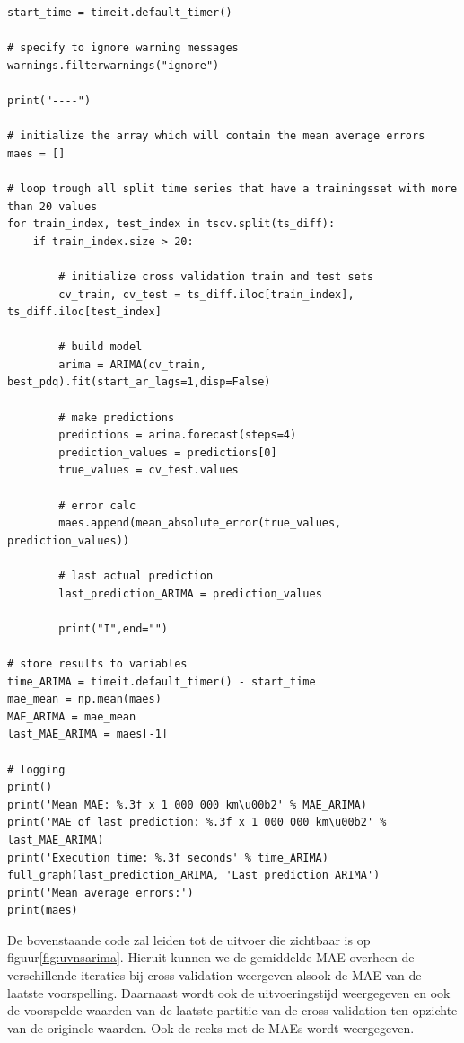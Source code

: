 \begin{verbatim}
start_time = timeit.default_timer()

# specify to ignore warning messages
warnings.filterwarnings("ignore") 

print("----")

# initialize the array which will contain the mean average errors
maes = []

# loop trough all split time series that have a trainingsset with more than 20 values
for train_index, test_index in tscv.split(ts_diff):
    if train_index.size > 20:
    
        # initialize cross validation train and test sets
        cv_train, cv_test = ts_diff.iloc[train_index], ts_diff.iloc[test_index]
        
        # build model
        arima = ARIMA(cv_train, best_pdq).fit(start_ar_lags=1,disp=False)
        
        # make predictions
        predictions = arima.forecast(steps=4)
        prediction_values = predictions[0]
        true_values = cv_test.values
        
        # error calc
        maes.append(mean_absolute_error(true_values, prediction_values))
        
        # last actual prediction 
        last_prediction_ARIMA = prediction_values
        
        print("I",end="")

# store results to variables
time_ARIMA = timeit.default_timer() - start_time
mae_mean = np.mean(maes)
MAE_ARIMA = mae_mean
last_MAE_ARIMA = maes[-1]

# logging
print()
print('Mean MAE: %.3f x 1 000 000 km\u00b2' % MAE_ARIMA)
print('MAE of last prediction: %.3f x 1 000 000 km\u00b2' % last_MAE_ARIMA)
print('Execution time: %.3f seconds' % time_ARIMA)
full_graph(last_prediction_ARIMA, 'Last prediction ARIMA')
print('Mean average errors:')
print(maes)
\end{verbatim}

De bovenstaande code zal leiden tot de uitvoer die zichtbaar is op figuur\ref{fig:uvnsarima}. Hieruit kunnen we de gemiddelde MAE overheen de verschillende iteraties bij cross validation weergeven alsook de MAE van de laatste voorspelling. Daarnaast wordt ook de uitvoeringstijd weergegeven en ook de voorspelde waarden van de laatste partitie van de cross validation ten opzichte van de originele waarden. Ook de reeks met de MAEs wordt weergegeven.

